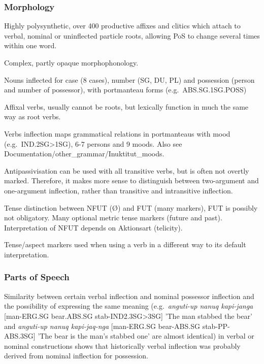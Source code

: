 \documentclass[a4paper, 11pt]{book}
\begin{document}
\subsubsection*{Morphology}

\begin{itemize*}
\item  Highly polysynthetic, over 400 productive affixes and clitics which attach to verbal, nominal or uninflected particle roots, allowing PoS to change several times within one word.
\item  Complex, partly opaque morphophonology.
\item  Nouns inflected for case (8 cases), number (SG, DU, PL) and possession (person and number of possessor), with portmanteau forms (e.g.\ ABS.SG.1SG.POSS) 
\item  Affixal verbs, usually cannot be roots, but lexically function in much the same way as root verbs.
\item  Verbs inflection maps grammatical relations in portmanteaus with mood (e.g.\ IND.2SG>1SG), 6-7 persons and 9 moods. Also see Documentation/other\_grammar/Inuktitut\_moods.
\item  Antipassivisation can be used with all transitive verbs, but is often not overtly marked. Therefore, it makes more sense to distinguish between two-argument and one-argument inflection, rather than transitive and intransitive inflection.
\item  Tense distinction between NFUT (Ø) and FUT (many markers), FUT is possibly not obligatory. Many optional metric tense markers (future and past). Interpretation of NFUT depends on Aktionsart (telicity).
\item  Tense/aspect markers used when using a verb in a different way to its default interpretation.
\end{itemize*}

\subsubsection*{Parts of Speech}

\begin{itemize*}
\item  Similarity between certain verbal inflection and nominal possessor inflection and the possibility of expressing the same meaning (e.g.\ \textit{anguti-up nanuq kapi-janga} [man-ERG.SG bear.ABS.SG stab-IND2.3SG>3SG] 'The man stabbed the bear' and \textit{anguti-up nanuq kapi-jaq-nga} [man-ERG.SG bear-ABS.SG stab-PP-ABS.3SG] 'The bear is the man's stabbed one' are almost identical) in verbal or nominal constructions shows that historically verbal inflection was probably derived from nominal inflection for possession.
  \end{itemize*}
\end{document}

